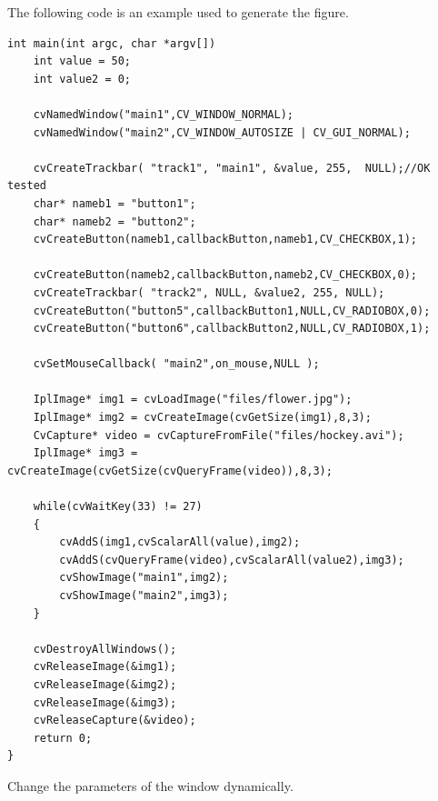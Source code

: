 The following code is an example used to generate the figure.
\begin{lstlisting}
int main(int argc, char *argv[])
    int value = 50;
    int value2 = 0;

    cvNamedWindow("main1",CV_WINDOW_NORMAL);
    cvNamedWindow("main2",CV_WINDOW_AUTOSIZE | CV_GUI_NORMAL);

    cvCreateTrackbar( "track1", "main1", &value, 255,  NULL);//OK tested
    char* nameb1 = "button1";
    char* nameb2 = "button2";
    cvCreateButton(nameb1,callbackButton,nameb1,CV_CHECKBOX,1);
	
    cvCreateButton(nameb2,callbackButton,nameb2,CV_CHECKBOX,0);
    cvCreateTrackbar( "track2", NULL, &value2, 255, NULL);
    cvCreateButton("button5",callbackButton1,NULL,CV_RADIOBOX,0);
    cvCreateButton("button6",callbackButton2,NULL,CV_RADIOBOX,1);

    cvSetMouseCallback( "main2",on_mouse,NULL );

    IplImage* img1 = cvLoadImage("files/flower.jpg");
    IplImage* img2 = cvCreateImage(cvGetSize(img1),8,3);
    CvCapture* video = cvCaptureFromFile("files/hockey.avi");
    IplImage* img3 = cvCreateImage(cvGetSize(cvQueryFrame(video)),8,3);

    while(cvWaitKey(33) != 27)
    {
        cvAddS(img1,cvScalarAll(value),img2);
        cvAddS(cvQueryFrame(video),cvScalarAll(value2),img3);
        cvShowImage("main1",img2);
        cvShowImage("main2",img3);
    }

    cvDestroyAllWindows();
    cvReleaseImage(&img1);
    cvReleaseImage(&img2);
    cvReleaseImage(&img3);
    cvReleaseCapture(&video);
    return 0;
}
\end{lstlisting}

\ifC
Change the parameters of the window dynamically.


